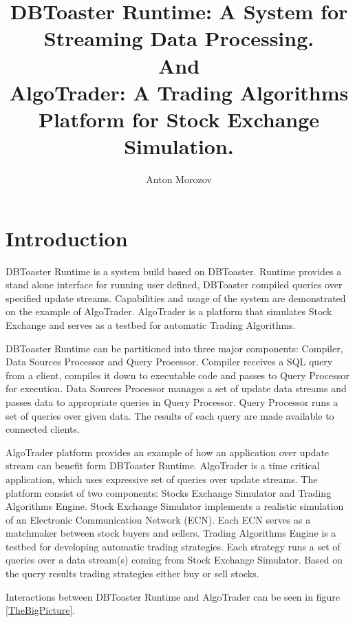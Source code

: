 \documentclass[14pt]{article}
\begin{document}
	
\title{DBToaster Runtime: A System for Streaming Data Processing. \\And\\ AlgoTrader: A Trading Algorithms Platform for Stock Exchange Simulation.}
\author{Anton Morozov}
\maketitle

\section{Introduction}

DBToaster Runtime is a system build based on DBToaster. Runtime provides a stand alone interface for running user defined, DBToaster compiled queries over specified update streams. Capabilities and usage of the system are demonstrated on the example of AlgoTrader. AlgoTrader is a platform that simulates Stock Exchange and serves as a testbed for automatic Trading Algorithms.   

DBToaster Runtime can be partitioned into three major components: Compiler, Data Sources Processor and Query Processor. Compiler receives a SQL query from a client, compiles it down to executable code and passes to Query Processor for execution. Data Sources Processor manages a set of update data streams and passes data to appropriate queries in Query Processor. Query Processor runs a set of queries over given data. The results of each query are made available to connected clients. 

AlgoTrader platform provides an example of how an application over update stream can benefit form DBToaster Runtime. AlgoTrader is a time critical application, which uses expressive set of queries over update streams. The platform consist of two components: Stocks Exchange Simulator and Trading Algorithms Engine. Stock Exchange Simulator implements a realistic simulation of an Electronic Communication Network (ECN). Each ECN serves as a matchmaker between stock buyers and sellers. Trading Algorithms Engine is a testbed for developing automatic trading strategies. Each strategy runs a set of queries over a data stream(s) coming from Stock Exchange Simulator. Based on the query results trading strategies either buy or sell stocks.

Interactions between DBToaster Runtime and AlgoTrader can be seen in figure \ref{TheBigPicture}.
\end{document}
